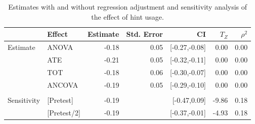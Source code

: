 \documentclass{article}\usepackage[]{graphicx}\usepackage[]{color}
\begin{document}
\begin{table}[ht]
\centering
\begin{tabular}{llrrrrr}
  \hline
  & Effect & Estimate & Std. Error & CI & $T_Z$ & $\rho^2$ \\ 
  \hline
\multirow{4}{*}{Estimate} & ANOVA & -0.18 & 0.05 & [-0.27,-0.08] & 0.00 & 0.00 \\ 
   & ATE & -0.21 & 0.05 & [-0.32,-0.11] & 0.00 & 0.00 \\ 
   & TOT & -0.18 & 0.06 & [-0.30,-0.07] & 0.00 & 0.00 \\ 
   & ANCOVA & -0.19 & 0.05 & [-0.29,-0.10] & 0.00 & 0.00 \\ 
  \hline &  &  &  &  &  &  \\ 
  \multirow{2}{*}{Sensitivity} & [Pretest] & -0.19 &  & [-0.47,0.09] & -9.86 & 0.18 \\ 
   & [Pretest/2] & -0.19 &  & [-0.37,-0.01] & -4.93 & 0.18 \\ 
   \hline
\end{tabular}
\caption{Estimates with and without regression adjustment and sensitivity analysis of the effect of hint usage.} 
\label{tab:matchResults}
\end{table}


\end{document}
